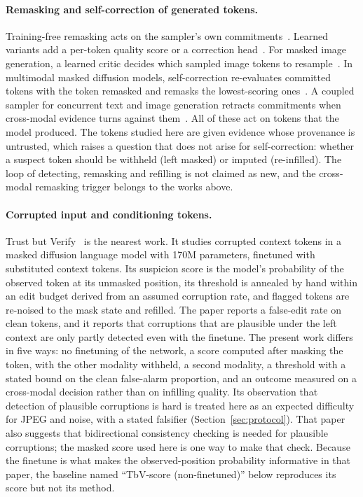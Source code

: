 \paragraph{Remasking and self-correction of generated tokens.}
Training-free remasking acts on the sampler's own commitments~\cite{wang2025remdm,zhai2026core,yao2026remask}.
Learned variants add a per-token quality score or a correction head~\cite{kim2025prism,schiff2026proseco,huang2025remedi}.
For masked image generation, a learned critic decides which sampled image tokens to resample~\cite{lezama2022tokencritic}.
In multimodal masked diffusion models, self-correction re-evaluates committed tokens with the token remasked and remasks the
lowest-scoring ones~\cite{ouyang2026freecorrection}.
A coupled sampler for concurrent text and image generation retracts commitments when cross-modal evidence turns against
them~\cite{le2026co2jump}.
All of these act on tokens that the model produced.
The tokens studied here are given evidence whose provenance is untrusted, which raises a question that does not arise for
self-correction: whether a suspect token should be withheld (left masked) or imputed (re-infilled).
The loop of detecting, remasking and refilling is not claimed as new, and the cross-modal remasking trigger belongs to the
works above.

\paragraph{Corrupted input and conditioning tokens.}
Trust but Verify~\cite{jhingran2026trustverify} is the nearest work.
It studies corrupted context tokens in a masked diffusion language model with 170M parameters, finetuned with substituted
context tokens.
Its suspicion score is the model's probability of the observed token at its unmasked position, its threshold is annealed
by hand within an edit budget derived from an assumed corruption rate, and flagged tokens are re-noised to the mask state and
refilled.
The paper reports a false-edit rate on clean tokens, and it reports that corruptions that are plausible under the left
context are only partly detected even with the finetune.
The present work differs in five ways: no finetuning of the network, a score computed after masking the token, with the
other modality withheld, a second modality, a threshold with a stated bound on the clean false-alarm proportion, and an outcome
measured on a cross-modal decision rather than on infilling quality.
Its observation that detection of plausible corruptions is hard is treated here as an expected difficulty for JPEG and noise,
with a stated falsifier (Section~\ref{sec:protocol}).
That paper also suggests that bidirectional consistency checking is needed for plausible corruptions; the masked score used
here is one way to make that check.
Because the finetune is what makes the observed-position probability informative in that paper, the baseline named
``TbV-score (non-finetuned)'' below reproduces its score but not its method.

